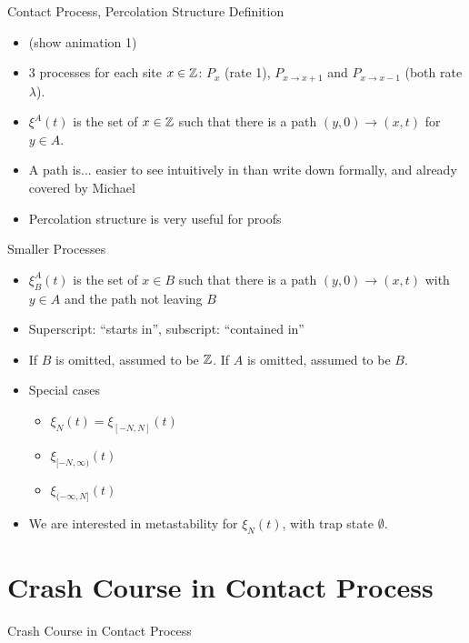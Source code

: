 \documentclass{beamer}
\newcommand{\ignore}[1]{}
\newcommand{\rb}{\ignore{[}]}
\begin{document}
\begin{frame}{Contact Process, Percolation Structure Definition}
  \begin{itemize}
    \item (show animation 1)
    \pause
    \item 3 processes for each site $x \in \mathbb{Z}$: $P_{x}$ (rate 1), $P_{x \to x+1}$ and $P_{x \to x-1}$ (both rate $\lambda$).
    \pause
    \item $\xi^{A}(t)$ is the set of $x \in \mathbb{Z}$ such that there is a path $(y,0) \to (x,t)$ for $y \in A$.
    \pause
    \item A path is... \pause easier to see intuitively in than write down formally, and already covered by Michael
    \pause
    \item Percolation structure is very useful for proofs
  \end{itemize}
\end{frame}

\begin{frame}{Smaller Processes}
  \begin{itemize}
    \item $\xi_{B}^{A}(t)$ is the set of $x \in B$ such that there is a path $(y,0) \to (x,t)$ with $y \in A$ and the path not leaving $B$
          \pause
    \item Superscript: ``starts in'', subscript: ``contained in''
          \pause
    \item If $B$ is omitted, assumed to be $\mathbb{Z}$. If $A$ is omitted, assumed to be $B$.
          \pause
    \item Special cases
    \begin{itemize}
      \item $\xi_{N}(t) = \xi_{[-N,N]}(t)$
      \item $\xi_{[-N,\infty)}(t)$
      \item $\xi_{(-\infty,N\rb}(t)$
    \end{itemize}
          \pause
    \item We are interested in metastability for $\xi_{N}(t)$, with trap state $\emptyset$.
  \end{itemize}
\end{frame}

\section{Crash Course in Contact Process}

\begin{frame}{Crash Course in Contact Process}
  \tableofcontents[currentsection]
\end{frame}
\end{document}
